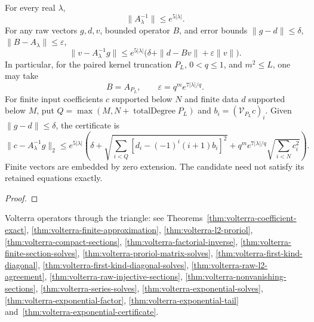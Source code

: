 \begin{theorem}
\label{thm:volterra-exponential-certificate}
\leanok
For every real $\lambda$,
\[
 \|A_\lambda^{-1}\|\le e^{5|\lambda|}.
\]
For any raw vectors $g,d,v$, bounded operator $B$, and error bounds
$\|g-d\|\le\delta$, $\|B-A_\lambda\|\le\varepsilon$,
\[
 \|v-A_\lambda^{-1}g\|\le
 e^{5|\lambda|}\bigl(\delta+\|d-Bv\|+\varepsilon\|v\|\bigr).
\]
In particular, for the paired kernel truncation $P_L$, $0<q\le1$, and
$m^2\le L$, one may take
\[
 B=A_{P_L},\qquad \varepsilon=q^m e^{7|\lambda|/q}.
\]
For finite input coefficients $c$ supported below $N$ and finite data $d$
supported below $M$, put $Q=\max(M,N+\operatorname{totalDegree}P_L)$ and
$b_i=(\mathcal V_{P_L}c)_i$. Given $\|g-d\|\le\delta$, the certificate is
\[
 \|c-A_\lambda^{-1}g\|_2\le e^{5|\lambda|}
 \left(\delta+
 \sqrt{\sum_{i<Q}[d_i-(-1)^i(i+1)b_i]^2}
 +q^m e^{7|\lambda|/q}\sqrt{\sum_{i<N}c_i^2}\right).
\]
Finite vectors are embedded by zero extension. The candidate need not satisfy
its retained equations exactly.
\end{theorem}
\begin{proof}
\leanok
\end{proof}



Volterra operators through the triangle: see Theorems~\ref{thm:volterra-coefficient-exact}, \ref{thm:volterra-finite-approximation}, \ref{thm:volterra-l2-proriol}, \ref{thm:volterra-compact-sections}, \ref{thm:volterra-factorial-inverse}, \ref{thm:volterra-finite-section-solves}, \ref{thm:volterra-proriol-matrix-solves}, \ref{thm:volterra-first-kind-diagonal}, \ref{thm:volterra-first-kind-diagonal-solves}, \ref{thm:volterra-raw-l2-agreement}, \ref{thm:volterra-raw-injective-sections}, \ref{thm:volterra-nonvanishing-sections}, \ref{thm:volterra-series-solves}, \ref{thm:volterra-exponential-solves}, \ref{thm:volterra-exponential-factor}, \ref{thm:volterra-exponential-tail} and~\ref{thm:volterra-exponential-certificate}.


